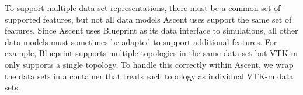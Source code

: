 To support multiple data set representations, there must be a common
set of supported features, but not all data models Ascent uses
support the same set of features.
%
Since Ascent uses Blueprint as its data interface to simulations,
all other data models must sometimes be adapted to support additional
features.
%
For example, Blueprint supports multiple topologies in the same data set
but VTK-m only supports a single topology.
%
To handle this correctly within Ascent, we wrap the data sets in a container
that treats each topology as individual VTK-m data sets.
%
